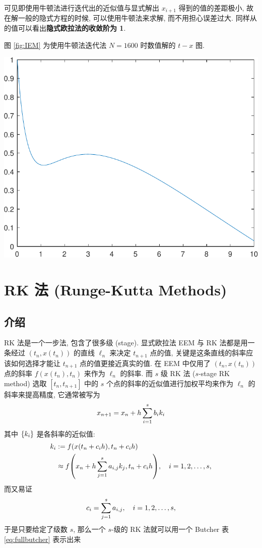 \documentclass[twoside]{ctexart}
\begin{document}
    可见即使用牛顿法进行迭代出的近似值与显式解出 $ x_{i+1} $ 得到的值的差距极小, 故在解一般的隐式方程的时候, 可以使用牛顿法来求解, 而不用担心误差过大. 同样从  的值可以看出\textbf{隐式欧拉法的收敛阶为 1}.
    
    图 \ref{fig:IEM} 为使用牛顿法迭代法 $ N = 1600 $  时数值解的 $ t-x $  图.
    \begin{center}
        \includegraphics[width=.4\textwidth]{figs/IEMNT.pdf}
          \label{fig:IEM}
    \end{center}

    \section{RK 法 (Runge-Kutta Methods)}
    \subsection{介绍}
    RK 法是一个一步法, 包含了很多级 (stage). 显式欧拉法 EEM 与 RK 法都是用一条经过 $ (t_{n}, x(t_{n})) $ 的直线 $ \ell_{n} $ 来决定 $ t_{n+1} $ 点的值, 关键是这条直线的斜率应该如何选择才能让 $ t_{n+1} $ 点的值更接近真实的值. 在 EEM 中仅用了 $ (t_{n}, x(t_{n})) $ 点的斜率 $ f(x(t_{n}), t_{n}) $ 来作为 $ \ell_{n} $ 的斜率. 而 $ s $ 级 RK 法 ($ s $-stage RK method) 选取 $ [t_{n}, t_{n+1}] $ 中的 $ s $ 个点的斜率的近似值进行加权平均来作为 $ \ell_{n} $ 的斜率来提高精度, 它通常被写为 
    \begin{align}\label{eq:RKi+1}
        x_{n+1} = x_{n} + h\sum_{i=1}^{s}b_{i}k_{i}
    \end{align}
    其中 $ \qty{k_{i}} $ 是各斜率的近似值:
    \begin{align}
        k_{i} & := f\qty(x(t_{n}+c_{i}h), t_{n}+c_{i}h)\notag\\
        & \approx f\qty(x_{n}+h\sum_{j=1}^{s}a_{i, j}k_{j}, t_{n}+c_{i}h), \quad i=1, 2, \dots, s,\label{eq:RK}
    \end{align} 
    而又易证
    \begin{align*}
        c_{i} = \sum_{j=1}^{s}a_{i, j},\quad i = 1, 2, \dots, s,
    \end{align*}
    于是只要给定了级数 $ s $, 那么一个 $ s $-级的 RK 法就可以用一个 Butcher 表 \ref{eq:fullbutcher} 表示出来
    
\end{document}
